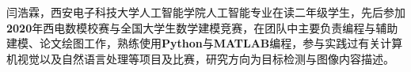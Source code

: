 \quad \quad  闫浩霖，西安电子科技大学人工智能学院人工智能专业在读二年级学生，先后参加\textbf{2020}年西电数模校赛与全国大学生数学建模竞赛，在团队中主要负责编程与辅助建模、论文绘图工作，熟练使用\textbf{Python}与\textbf{MATLAB}编程，参与实践过有关计算机视觉以及自然语言处理等项目及比赛，研究方向为目标检测与图像内容描述。
